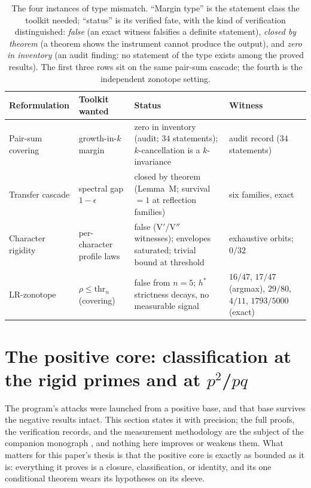 \documentclass[11pt,a4paper]{article}
\numberwithin{equation}{section}
\theoremstyle{plain}
\theoremstyle{definition}
\theoremstyle{remark}
\begin{document}
\begin{table}[htbp]
\centering
\small
\caption{The four instances of type mismatch. ``Margin type'' is the
statement class the toolkit needed; ``status'' is its verified fate,
with the kind of verification distinguished: \emph{false} (an exact
witness falsifies a definite statement), \emph{closed by theorem} (a
theorem shows the instrument cannot produce the output), and
\emph{zero in inventory} (an audit finding: no statement of the type
exists among the proved results). The first three rows sit on the same
pair-sum cascade; the fourth is the independent zonotope setting.}
\label{tab:instances}
\begin{tabularx}{\textwidth}{@{} l >{\raggedright\arraybackslash}X
>{\raggedright\arraybackslash}X l @{}}
\toprule
Reformulation & Toolkit wanted & Status & Witness \\
\midrule
Pair-sum covering & growth-in-$k$ margin & zero in inventory (audit;
$34$ statements); $k$-cancellation is a $k$-invariance & audit record
($34$ statements) \\
Transfer cascade & spectral gap $1-\epsilon$ & closed by theorem
(Lemma~M; survival $=1$ at reflection families) & six families, exact \\
Character rigidity & per-character profile laws & false (V$'$/V$''$
witnesses); envelopes saturated; trivial bound at threshold &
exhaustive orbits; $0/32$ \\
LR-zonotope & $\rho\le\mathrm{thr}_n$ (covering) & false from $n=5$;
$h^*$ strictness decays, no measurable signal & $16/47$, $17/47$
(argmax), $29/80$, $4/11$, $1793/5000$ (exact) \\
\bottomrule
\end{tabularx}
\end{table}


\section{The positive core: classification at the rigid primes and at
\boldmath$p^2$/$pq$}\label{sec:positive}

The program's attacks were launched from a positive base, and that base
survives the negative results intact. This section states it with
precision; the full proofs, the verification records, and the
measurement methodology are the subject of the companion monograph
\cite{prog-artifacts}, and nothing here improves or weakens them. What
matters for this paper's thesis is that the positive core is exactly as
bounded as it is: everything it proves is a closure, classification, or
identity, and its one conditional theorem wears its hypotheses on its
sleeve.
\end{document}

